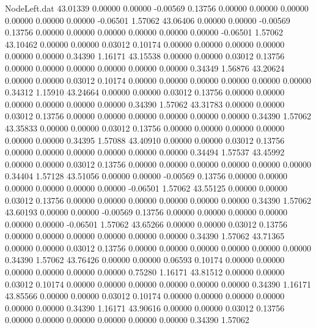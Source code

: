 \begin{filecontents}{NodeLeft.dat}
  43.01339    0.00000    0.00000    -0.00569    0.13756    0.00000    0.00000    0.00000    0.00000    0.00000    0.00000   -0.06501    1.57062
  43.06406    0.00000    0.00000    -0.00569    0.13756    0.00000    0.00000    0.00000    0.00000    0.00000    0.00000   -0.06501    1.57062
  43.10462    0.00000    0.00000     0.03012    0.10174    0.00000    0.00000    0.00000    0.00000    0.00000    0.00000    0.34390    1.16171
  43.15538    0.00000    0.00000     0.03012    0.13756    0.00000    0.00000    0.00000    0.00000    0.00000    0.00000    0.34349    1.56876
  43.20624    0.00000    0.00000     0.03012    0.10174    0.00000    0.00000    0.00000    0.00000    0.00000    0.00000    0.34312    1.15910
  43.24664    0.00000    0.00000     0.03012    0.13756    0.00000    0.00000    0.00000    0.00000    0.00000    0.00000    0.34390    1.57062
  43.31783    0.00000    0.00000     0.03012    0.13756    0.00000    0.00000    0.00000    0.00000    0.00000    0.00000    0.34390    1.57062
  43.35833    0.00000    0.00000     0.03012    0.13756    0.00000    0.00000    0.00000    0.00000    0.00000    0.00000    0.34395    1.57088
  43.40910    0.00000    0.00000     0.03012    0.13756    0.00000    0.00000    0.00000    0.00000    0.00000    0.00000    0.34494    1.57537
  43.45992    0.00000    0.00000     0.03012    0.13756    0.00000    0.00000    0.00000    0.00000    0.00000    0.00000    0.34404    1.57128
  43.51056    0.00000    0.00000    -0.00569    0.13756    0.00000    0.00000    0.00000    0.00000    0.00000    0.00000   -0.06501    1.57062
  43.55125    0.00000    0.00000     0.03012    0.13756    0.00000    0.00000    0.00000    0.00000    0.00000    0.00000    0.34390    1.57062
  43.60193    0.00000    0.00000    -0.00569    0.13756    0.00000    0.00000    0.00000    0.00000    0.00000    0.00000   -0.06501    1.57062
  43.65266    0.00000    0.00000     0.03012    0.13756    0.00000    0.00000    0.00000    0.00000    0.00000    0.00000    0.34390    1.57062
  43.71365    0.00000    0.00000     0.03012    0.13756    0.00000    0.00000    0.00000    0.00000    0.00000    0.00000    0.34390    1.57062
  43.76426    0.00000    0.00000     0.06593    0.10174    0.00000    0.00000    0.00000    0.00000    0.00000    0.00000    0.75280    1.16171
  43.81512    0.00000    0.00000     0.03012    0.10174    0.00000    0.00000    0.00000    0.00000    0.00000    0.00000    0.34390    1.16171
  43.85566    0.00000    0.00000     0.03012    0.10174    0.00000    0.00000    0.00000    0.00000    0.00000    0.00000    0.34390    1.16171
  43.90616    0.00000    0.00000     0.03012    0.13756    0.00000    0.00000    0.00000    0.00000    0.00000    0.00000    0.34390    1.57062

\end{filecontents}
